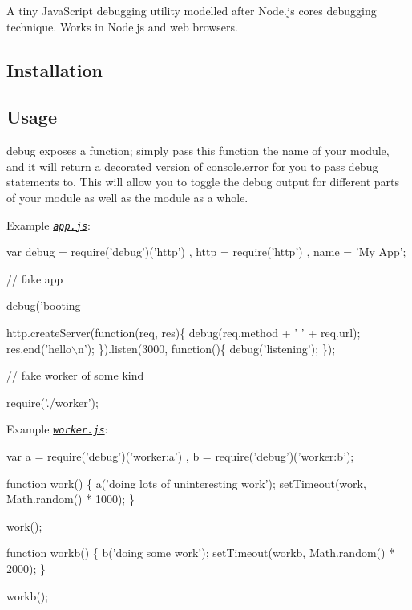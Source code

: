 \href{https://travis-ci.org/visionmedia/debug}{\tt } \href{https://coveralls.io/github/visionmedia/debug?branch=master}{\tt } \href{https://visionmedia-community-slackin.now.sh/}{\tt } \href{#backers}{\tt } \href{#sponsors}{\tt }



A tiny Java\+Script debugging utility modelled after Node.\+js core\textquotesingle{}s debugging technique. Works in Node.\+js and web browsers.

\subsection*{Installation}




\subsection*{Usage}

{\ttfamily debug} exposes a function; simply pass this function the name of your module, and it will return a decorated version of {\ttfamily console.\+error} for you to pass debug statements to. This will allow you to toggle the debug output for different parts of your module as well as the module as a whole.

Example \href{./examples/node/app.js}{\tt {\itshape app.\+js}}\+:


\begin{DoxyCode}
var debug = require('debug')('http')
  , http = require('http')
  , name = 'My App';

// fake app

debug('booting %

http.createServer(function(req, res)\{
  debug(req.method + ' ' + req.url);
  res.end('hello\(\backslash\)n');
\}).listen(3000, function()\{
  debug('listening');
\});

// fake worker of some kind

require('./worker');
\end{DoxyCode}


Example \href{./examples/node/worker.js}{\tt {\itshape worker.\+js}}\+:


\begin{DoxyCode}
var a = require('debug')('worker:a')
  , b = require('debug')('worker:b');

function work() \{
  a('doing lots of uninteresting work');
  setTimeout(work, Math.random() * 1000);
\}

work();

function workb() \{
  b('doing some work');
  setTimeout(workb, Math.random() * 2000);
\}

workb();
\end{DoxyCode}


